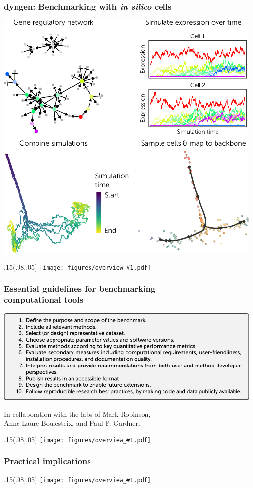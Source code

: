 \documentclass[usepdftitle=false, compress]{beamer}
\newcommand{\topright}[1]{%
\begin{textblock*}{.15\linewidth}(.98\linewidth,.05\linewidth)
	\texttt{[image: figures/overview\_\#1.pdf]}
\end{textblock*}}
\begin{document}
\begin{frame}
	\frametitle{dyngen: Benchmarking with \textit{in silico} cells}
	\begin{center}
		\includegraphics[width=.6\linewidth]{figures/end_part_dyngen.pdf}
	\end{center}
	\topright{ch2}
\end{frame}

\begin{frame}
	\frametitle{Essential guidelines for benchmarking\\computational tools}
	\begin{center}
		\includegraphics[width=\linewidth]{figures/end_part_guidelines.pdf}
	\end{center}
	{\scriptsize 
	\begin{flushright}
		In collaboration with the labs of Mark Robinson,\\Anne-Laure Boulesteix, and Paul P. Gardner.
	\end{flushright}}
	\topright{ch9}
\end{frame}



\begin{frame}
	\frametitle{Practical implications}
  \topright{all}
\end{frame}
\end{document}
